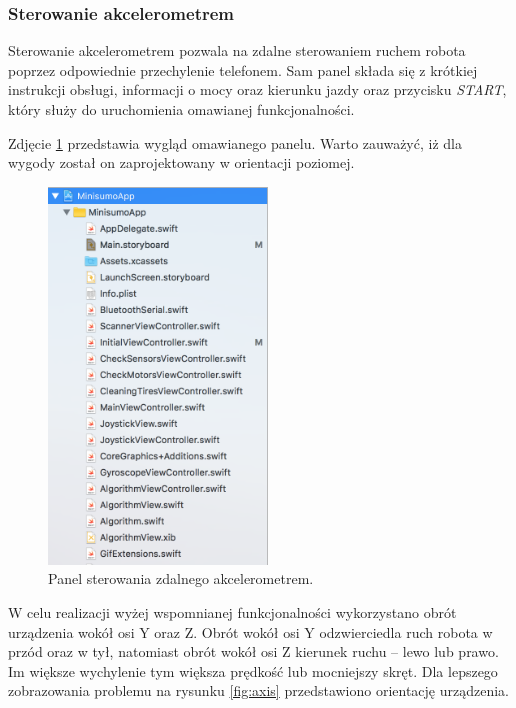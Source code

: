 \subsubsection{Sterowanie akcelerometrem}
Sterowanie akcelerometrem pozwala na zdalne sterowaniem ruchem robota poprzez odpowiednie przechylenie telefonem. Sam panel składa się z krótkiej instrukcji obsługi, informacji o mocy oraz kierunku jazdy oraz przycisku \textit{START}, który służy do uruchomienia omawianej funkcjonalności.


Zdjęcie \ref{fig:accview} przedstawia wygląd omawianego panelu. Warto zauważyć, iż dla wygody został on zaprojektowany w orientacji poziomej.

\begin{figure}[H]
	\centering
		\includegraphics[width=0.75\linewidth, height=10cm, keepaspectratio]{pic05/structure.png}
	\caption{Panel sterowania zdalnego akcelerometrem.}
	\label{fig:accview}	
\end{figure}

W celu realizacji wyżej wspomnianej funkcjonalności wykorzystano obrót urządzenia wokół osi Y oraz Z. Obrót wokół osi Y odzwierciedla ruch robota w przód oraz w tył, natomiast obrót wokół osi Z kierunek ruchu – lewo lub prawo. Im większe wychylenie tym większa prędkość lub mocniejszy skręt. Dla lepszego zobrazowania problemu na rysunku \ref{fig:axis} przedstawiono orientację urządzenia.

